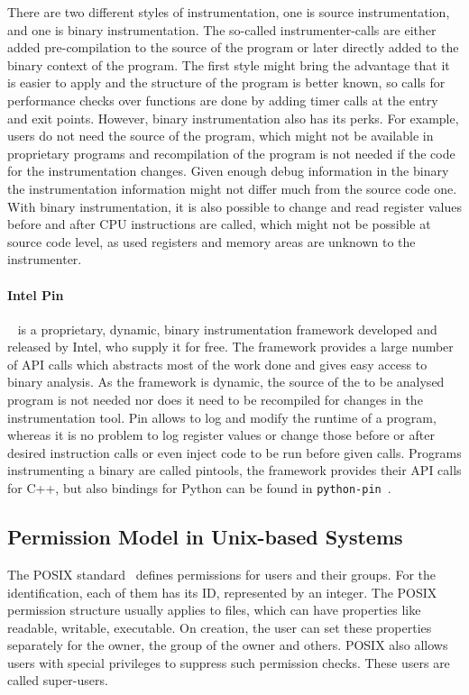 There are two different styles of instrumentation, one is source
instrumentation, and one is binary instrumentation. The so-called
instrumenter-calls are either added pre-compilation to the source of the program
or later directly added to the binary context of the program. The first style
might bring the advantage that it is easier to apply and the structure of the
program is better known, so calls for performance checks over functions are done
by adding timer calls at the entry and exit points. However, binary
instrumentation also has its perks. For example, users do not need the source of
the program, which might not be available in proprietary programs and
recompilation of the program is not needed if the code for the instrumentation
changes. Given enough debug information in the binary the instrumentation
information might not differ much from the source code one. With binary
instrumentation, it is also possible to change and read register values before
and after CPU instructions are called, which might not be possible at source
code level, as used registers and memory areas are unknown to the instrumenter.

\paragraph{Intel Pin}~\cite{pintool} is a proprietary, dynamic, binary
instrumentation framework developed and released by Intel, who supply it for
free. The framework provides a large number of API calls which abstracts most of
the work done and gives easy access to binary analysis. As the framework is
dynamic, the source of the to be analysed program is not needed nor does it need
to be recompiled for changes in the instrumentation tool. Pin allows to log and
modify the runtime of a program, whereas it is no problem to log register values
or change those before or after desired instruction calls or even inject code to
be run before given calls. Programs instrumenting a binary are called pintools,
the framework provides their API calls for C++, but also bindings for Python can
be found in \texttt{python-pin}~\cite{pythonpin}.

\subsection{Permission Model in Unix-based Systems}

The POSIX standard~\cite{posix} defines permissions for users and their groups.
For the identification, each of them has its ID, represented by an integer. The
POSIX permission structure usually applies to files, which can have properties
like readable, writable, executable. On creation, the user can set these
properties separately for the owner, the group of the owner and others. POSIX
also allows users with special privileges to suppress such permission checks.
These users are called super-users.

